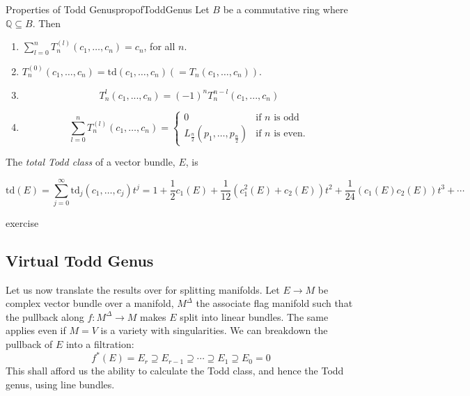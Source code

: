 \documentclass{ut-thesis}
\newenvironment{Proof}[1][]
  {\begin{ProofTcb}[#1]}
  {\end{ProofTcb}}
\newcommand{\Q}{{\mathbb{Q}}}
\newcommand{\sse}{\subseteq}
\begin{document}
\begin{prop}{Properties of Todd Genus}{propofToddGenus}
  Let $B$ be a commutative ring where $\Q \sse B$. Then
  \begin{enumerate}
  \item $\sum_{l=0}^n T_n^{(l)}(c_1,\ldots,c_n) = c_n$, for all $n$.

  \item $T_n^{(0)}(c_1,\ldots,c_n) = \text{td}(c_1,\ldots,c_n) (= T_n(c_1,\ldots,c_n))$.
    \item
  \[
    T_n^{l}(c_1, ..., c_n)=(-1)^n T_n^{n-l}(c_1, ..., c_n)
  \]
  \item
  \[
      \sum_{l=0}^n T_n^{(l)}(c_1,\ldots,c_n) = \begin{cases}
          0 & \text{if }n\text{ is odd} \\
          L_{\frac{n}{2}}(p_1,\ldots,p_{\frac{n}{2}}) & \text{if }n\text{ is even.}
      \end{cases}
  \]
  \end{enumerate}

  The \textit{total Todd class} of a vector bundle, $E$, is

\[
    \text{td}(E) = \sum_{j=0}^{\infty} \text{td}_j(c_1,\ldots,c_j)t^j = 1 + \frac{1}{2}c_1(E) + \frac{1}{12}(c_1^2(E) + c_2(E))t^2 + \frac{1}{24}(c_1(E)c_2(E))t^3 + \cdots
\]

\end{prop}

\begin{Proof}
  exercise
\end{Proof}


\subsection{Virtual Todd Genus}\label{sec:virtToddGenus}

Let us now translate the results over for splitting manifolds. Let $E \to M$ be complex vector bundle over a
manifold, $M^\Delta$ the associate flag manifold such that the pullback along $f: M^\Delta \to M$ makes $E$ split into
linear bundles. The same applies even if $M = V$ is a variety with singularities. We can breakdown the
pullback of $E$ into a filtration:
\[
  f^*(E) = E_r \supseteq E_{r-1} \supseteq \cdots \supseteq E_1 \supseteq E_0  =0
\]
This shall afford us the ability to calculate the Todd class, and hence the Todd genus, using line bundles.
\end{document}
